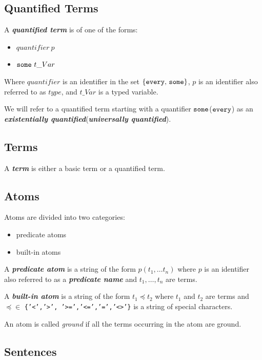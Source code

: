 \documentclass[a4paper,10pt]{article}
\begin{document}
\subsection{Quantified Terms}

A \textit{\textbf{quantified term}} is of one of the forms:
\begin{itemize}
\item $ quantifier~p $
\item $ \mbox{\texttt{some}}~t\_Var$
\end{itemize} 


Where $quantifier$ is an identifier in the set $\{\mbox{\texttt{every}, \texttt{some}}\}$, $p$ is an identifier also referred to as $type$,  and $t\_Var$ is a typed variable.

We will refer to a quantified term starting with a quantifier $\mbox{\texttt{some}}$($\mbox{\texttt{every}}$) as an \textbf{\textit{existentially quantified}}(\textbf{\textit{universally quantified}}).  

\subsection{Terms}
A \textit{\textbf{term}} is either a basic term or a quantified term.
\subsection{Atoms}

Atoms are divided into two categories:
\begin{itemize}
\item predicate atoms
\item built-in atoms
\end{itemize}

A \textit{\textbf{predicate atom}} is a string of the form $p(t_1,\ldots t_n)$ where 
$p$ is an identifier also referred to as a \textbf{\textit{predicate name}} and $t_1,\ldots,t_n$ are terms.

A \textit{\textbf{built-in atom}} is a string of the form $t_1 \preceq t_2$ where $t_1$ and $t_2$ are terms and $\preceq \in$ \texttt{\{'<','>', '>=','<=','=','<>'\}} is a string of special characters.

An atom is called \textit{ground} if all the terms occurring in the atom are ground.
\subsection{Sentences}
\end{document}
